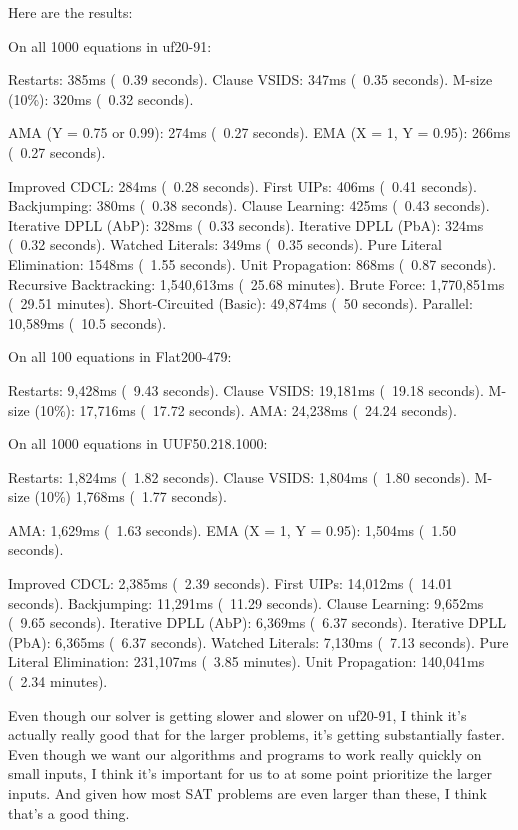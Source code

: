 Here are the results:
\begin{FVerbatim}
On all 1000 equations in uf20-91:

Restarts:                   385ms (~0.39 seconds).
Clause VSIDS:               347ms (~0.35 seconds).
M-size (10\%):              320ms (~0.32 seconds).

AMA (Y = 0.75 or 0.99):     274ms (~0.27 seconds).
EMA (X = 1, Y = 0.95):      266ms (~0.27 seconds).

Improved CDCL:              284ms (~0.28 seconds).
First UIPs:                 406ms (~0.41 seconds).
Backjumping:                380ms (~0.38 seconds).
Clause Learning:            425ms (~0.43 seconds).
Iterative DPLL (AbP):       328ms (~0.33 seconds).
Iterative DPLL (PbA):       324ms (~0.32 seconds).
Watched Literals:           349ms (~0.35 seconds).
Pure Literal Elimination:   1548ms (~1.55 seconds).
Unit Propagation:           868ms (~0.87 seconds).
Recursive Backtracking:     1,540,613ms (~25.68 minutes).
Brute Force:                1,770,851ms (~29.51 minutes).
Short-Circuited (Basic):    49,874ms (~50 seconds).
Parallel:                   10,589ms (~10.5 seconds).

On all 100 equations in Flat200-479:

Restarts:                   9,428ms  (~9.43 seconds).
Clause VSIDS:               19,181ms (~19.18 seconds).
M-size (10\%):              17,716ms (~17.72 seconds).
AMA:                        24,238ms (~24.24 seconds).

On all 1000 equations in UUF50.218.1000:

Restarts:                   1,824ms (~1.82 seconds).
Clause VSIDS:               1,804ms (~1.80 seconds).
M-size (10\%)               1,768ms (~1.77 seconds).

AMA:                        1,629ms (~1.63 seconds).
EMA (X = 1, Y = 0.95):      1,504ms (~1.50 seconds).

Improved CDCL:              2,385ms (~2.39 seconds).
First UIPs:                 14,012ms (~14.01 seconds).
Backjumping:                11,291ms (~11.29 seconds).
Clause Learning:            9,652ms (~9.65 seconds).
Iterative DPLL (AbP):       6,369ms (~6.37 seconds).
Iterative DPLL (PbA):       6,365ms (~6.37 seconds).
Watched Literals:           7,130ms (~7.13 seconds).
Pure Literal Elimination:   231,107ms (~3.85 minutes).
Unit Propagation:           140,041ms (~2.34 minutes).
\end{FVerbatim}
\noindent
Even though our solver is getting slower and slower on uf20-91, I think it's
actually really good that for the larger problems, it's getting substantially 
faster. Even though we want our algorithms and programs to work really quickly 
on small inputs, I think it's important for us to at some point prioritize the 
larger inputs. And given how most SAT problems are even larger than these, 
I think that's a good thing. 

